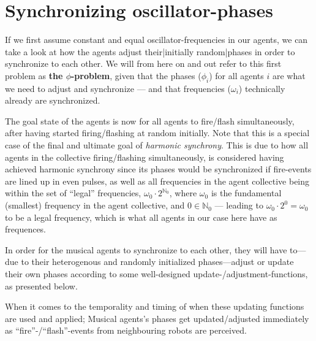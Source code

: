 	
	
	
	
	
	
	
	




\section{Synchronizing oscillator-phases}
\label{sec:phase_methods}

	If we first assume constant and equal oscillator-frequencies in our agents, we can take a look at how the agents adjust their|initially random|phases in order to synchronize to each other. We will from here on and out refer to this first problem as \textbf{the $\phi$-problem}, given that the phases ($\phi_i$) for all agents $i$ are what we need to adjust and synchronize — and that frequencies ($\omega_i$) technically already are synchronized.
	
	The goal state of the agents is now for all agents to fire/flash simultaneously, after having started firing/flashing at random initially. Note that this is a special case of the final and ultimate goal of \textit{harmonic synchrony}. This is due to how all agents in the collective firing/flashing simultaneously, is considered having achieved harmonic synchrony since its phases would be synchronized if fire-events are lined up in even pulses, as well as all frequencies in the agent collective being within the set of ``legal'' frequencies, $\omega_{0} \cdot 2^{\mathbb{N}_0}$, where $\omega_0$ is the fundamental (smallest) frequency in the agent collective, and $0 \in \mathbb{N}_0$ — leading to $\omega_0 \cdot 2^0 = \omega_0$ to be a legal frequency, which is what all agents in our case here have as frequences.
	
	In order for the musical agents to synchronize to each other, they will have to—due to their heterogenous and randomly initialized phases—adjust or update their own phases according to some well-designed update-/adjustment-functions, as presented below.
	
	When it comes to the temporality and timing of when these updating functions are used and applied; Musical agents's phases get updated/adjusted immediately as ``fire''-/``flash''-events from neighbouring robots are perceived.
	
